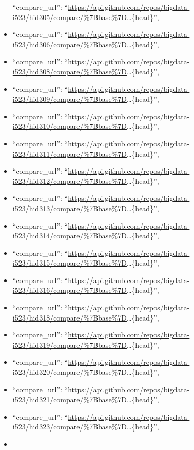 \begin{itemize}
  ``compare\_url'':
  ``\url{https://api.github.com/repos/bigdata-i523/hid305/compare/\%7Bbase\%7D}\ldots{}\{head\}'',
\item
  ``compare\_url'':
  ``\url{https://api.github.com/repos/bigdata-i523/hid306/compare/\%7Bbase\%7D}\ldots{}\{head\}'',
\item
  ``compare\_url'':
  ``\url{https://api.github.com/repos/bigdata-i523/hid308/compare/\%7Bbase\%7D}\ldots{}\{head\}'',
\item
  ``compare\_url'':
  ``\url{https://api.github.com/repos/bigdata-i523/hid309/compare/\%7Bbase\%7D}\ldots{}\{head\}'',
\item
  ``compare\_url'':
  ``\url{https://api.github.com/repos/bigdata-i523/hid310/compare/\%7Bbase\%7D}\ldots{}\{head\}'',
\item
  ``compare\_url'':
  ``\url{https://api.github.com/repos/bigdata-i523/hid311/compare/\%7Bbase\%7D}\ldots{}\{head\}'',
\item
  ``compare\_url'':
  ``\url{https://api.github.com/repos/bigdata-i523/hid312/compare/\%7Bbase\%7D}\ldots{}\{head\}'',
\item
  ``compare\_url'':
  ``\url{https://api.github.com/repos/bigdata-i523/hid313/compare/\%7Bbase\%7D}\ldots{}\{head\}'',
\item
  ``compare\_url'':
  ``\url{https://api.github.com/repos/bigdata-i523/hid314/compare/\%7Bbase\%7D}\ldots{}\{head\}'',
\item
  ``compare\_url'':
  ``\url{https://api.github.com/repos/bigdata-i523/hid315/compare/\%7Bbase\%7D}\ldots{}\{head\}'',
\item
  ``compare\_url'':
  ``\url{https://api.github.com/repos/bigdata-i523/hid316/compare/\%7Bbase\%7D}\ldots{}\{head\}'',
\item
  ``compare\_url'':
  ``\url{https://api.github.com/repos/bigdata-i523/hid318/compare/\%7Bbase\%7D}\ldots{}\{head\}'',
\item
  ``compare\_url'':
  ``\url{https://api.github.com/repos/bigdata-i523/hid319/compare/\%7Bbase\%7D}\ldots{}\{head\}'',
\item
  ``compare\_url'':
  ``\url{https://api.github.com/repos/bigdata-i523/hid320/compare/\%7Bbase\%7D}\ldots{}\{head\}'',
\item
  ``compare\_url'':
  ``\url{https://api.github.com/repos/bigdata-i523/hid321/compare/\%7Bbase\%7D}\ldots{}\{head\}'',
\item
  ``compare\_url'':
  ``\url{https://api.github.com/repos/bigdata-i523/hid323/compare/\%7Bbase\%7D}\ldots{}\{head\}'',
\item

\end{itemize}
